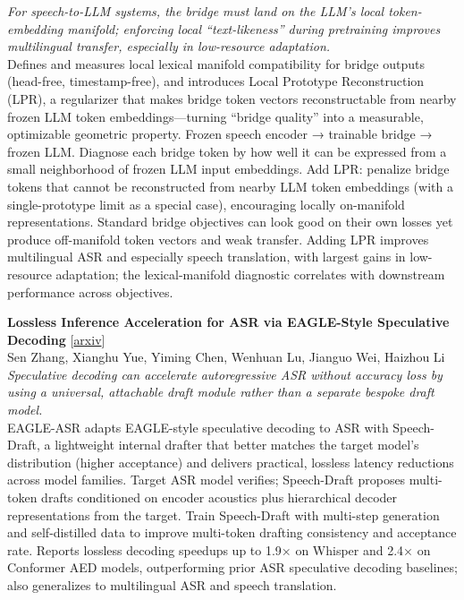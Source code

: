 \documentclass[12pt,letterpaper]{article}
\begin{document}
{\small\textit{For speech-to-LLM systems, the bridge must land on the LLM's local token-embedding manifold; enforcing local ``text-likeness'' during pretraining improves multilingual transfer, especially in low-resource adaptation.}}\\[1pt]
{\footnotesize Defines and measures local lexical manifold compatibility for bridge outputs (head-free, timestamp-free), and introduces Local Prototype Reconstruction (LPR), a regularizer that makes bridge token vectors reconstructable from nearby frozen LLM token embeddings---turning ``bridge quality'' into a measurable, optimizable geometric property. Frozen speech encoder → trainable bridge → frozen LLM. Diagnose each bridge token by how well it can be expressed from a small neighborhood of frozen LLM input embeddings. Add LPR: penalize bridge tokens that cannot be reconstructed from nearby LLM token embeddings (with a single-prototype limit as a special case), encouraging locally on-manifold representations. Standard bridge objectives can look good on their own losses yet produce off-manifold token vectors and weak transfer. Adding LPR improves multilingual ASR and especially speech translation, with largest gains in low-resource adaptation; the lexical-manifold diagnostic correlates with downstream performance across objectives.}

\medskip

{\small\textbf{Lossless Inference Acceleration for ASR via EAGLE-Style Speculative Decoding}} {\scriptsize[\href{https://arxiv.org/abs/2610.13506}{arxiv}]}\\
{\scriptsize Sen Zhang, Xianghu Yue, Yiming Chen, Wenhuan Lu, Jianguo Wei, Haizhou Li}\\

{\small\textit{Speculative decoding can accelerate autoregressive ASR without accuracy loss by using a universal, attachable draft module rather than a separate bespoke draft model.}}\\[1pt]
{\footnotesize EAGLE-ASR adapts EAGLE-style speculative decoding to ASR with Speech-Draft, a lightweight internal drafter that better matches the target model's distribution (higher acceptance) and delivers practical, lossless latency reductions across model families. Target ASR model verifies; Speech-Draft proposes multi-token drafts conditioned on encoder acoustics plus hierarchical decoder representations from the target. Train Speech-Draft with multi-step generation and self-distilled data to improve multi-token drafting consistency and acceptance rate. Reports lossless decoding speedups up to 1.9× on Whisper and 2.4× on Conformer AED models, outperforming prior ASR speculative decoding baselines; also generalizes to multilingual ASR and speech translation.}
\end{document}
